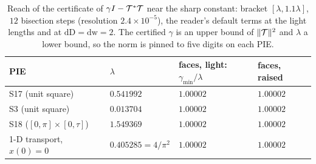 \begin{table}[h]\centering\footnotesize
\setlength{\tabcolsep}{6pt}
\begin{tabular}{llll}
\toprule
PIE & $\lambda$ & faces, light: $\gamma_{\min}/\lambda$ & faces, raised \\
\midrule
S17 (unit square) & $0.541992$ & $1.00002$ & $1.00002$ \\
S3 (unit square) & $0.013704$ & $1.00002$ & $1.00002$ \\
S18 ($[0,\pi]\times[0,\tau]$) & $1.549369$ & $1.00002$ & $1.00002$ \\
1-D transport, $x(0)=0$ & $0.405285=4/\pi^2$ & $1.00002$ & $1.00002$ \\
\bottomrule
\end{tabular}
\caption{Reach of the certificate of $\gamma I-\mathcal{T}^*\mathcal{T}$ near the sharp constant: bracket $[\lambda,1.1\lambda]$, $12$ bisection steps (resolution $2.4\times10^{-5}$), the reader's default terms at the light lengths and at $\mathrm{dD}=\mathrm{dw}=2$. The certified $\gamma$ is an upper bound of $\|\mathcal{T}\|^2$ and $\lambda$ a lower bound, so the norm is pinned to five digits on each PIE.}\label{tab:poinc2}
\end{table}

